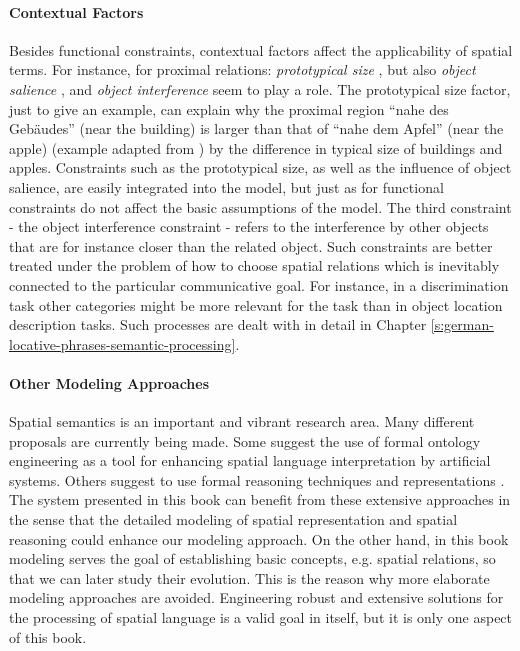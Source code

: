 \paragraph*{Contextual Factors}
Besides functional constraints, contextual factors affect the
applicability of spatial terms. For instance, for proximal relations: 
\emph{prototypical size} \citep{gapp1994basic}, but also 
\emph{object salience} \citep{regier2001grounding}, and \emph{object interference} 
\citep{kelleher2009dialog} seem to play a role.
The prototypical size factor, just to give an example, can explain
why the proximal region ``nahe des Geb\"audes''
(near the building) is larger than that of ``nahe dem Apfel'' (near the apple) 
(example adapted from \citealp{gapp1994basic}) by the difference in typical 
size of buildings and apples. 
Constraints such as the prototypical size, as well as the influence of
object salience, are easily integrated into the model, but just as 
for functional constraints do not affect the basic assumptions
of the model. The third constraint - the object interference constraint -
refers to the interference by other objects that are for
instance closer than the related object. Such constraints are better treated 
under the problem of how to choose spatial relations which is inevitably
connected to the particular communicative goal. 
For instance, in a discrimination task other categories
might be more relevant for the task than in object location description tasks.
Such processes are dealt with in detail in Chapter \ref{s:german-locative-phrases-semantic-processing}.


\paragraph*{Other Modeling Approaches}
Spatial semantics is an important and vibrant research area. 
Many different proposals are currently being made. Some suggest 
the use of formal ontology engineering \citep{bateman2007role,bateman2010situating,bateman2010ontology}
as a tool for enhancing spatial language interpretation by artificial 
systems. Others suggest to use formal reasoning techniques
and representations \citep{freksa1991qualitative,cohn2001qualitative}.
The system presented in this book can benefit from these
extensive approaches in the sense that the detailed modeling 
of spatial representation and spatial reasoning could enhance
our modeling approach. On the other hand, in this book modeling 
serves the goal of establishing basic concepts, e.g. spatial relations,
so that we can later study their evolution. This is the
reason why more elaborate modeling approaches are avoided. Engineering
robust and extensive solutions for the processing of spatial
language is a valid goal in itself, but it is only one aspect of 
this book.

